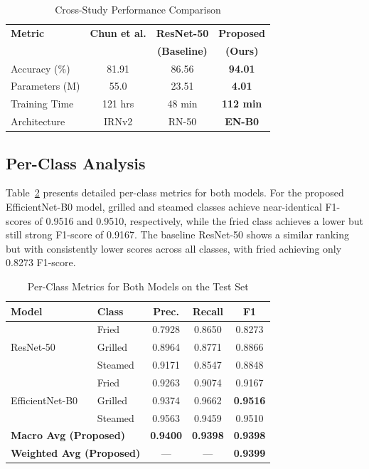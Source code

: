 \documentclass[journal]{IEEEtran}
\begin{document}
\begin{table}[!t]
\centering
\caption{Cross-Study Performance Comparison}
\label{tab:cross_comparison}
\begin{tabular}{lccc}
\toprule
\textbf{Metric} & \textbf{Chun et al.} & \textbf{ResNet-50} & \textbf{Proposed} \\
 & \textbf{\cite{chun2022korean}} & \textbf{(Baseline)} & \textbf{(Ours)} \\
\midrule
Accuracy (\%) & 81.91 & 86.56 & \textbf{94.01} \\
Parameters (M) & 55.0 & 23.51 & \textbf{4.01} \\
Training Time & 121 hrs & 48 min & \textbf{112 min} \\
Architecture & IRNv2 & RN-50 & \textbf{EN-B0} \\
\bottomrule
\end{tabular}
\end{table}

\subsection{Per-Class Analysis}

Table~\ref{tab:per_class} presents detailed per-class metrics for both models. For the proposed EfficientNet-B0 model, grilled and steamed classes achieve near-identical F1-scores of 0.9516 and 0.9510, respectively, while the fried class achieves a lower but still strong F1-score of 0.9167. The baseline ResNet-50 shows a similar ranking but with consistently lower scores across all classes, with fried achieving only 0.8273 F1-score.

\begin{table}[!t]
\centering
\caption{Per-Class Metrics for Both Models on the Test Set}
\label{tab:per_class}
\begin{tabular}{llccc}
\toprule
\textbf{Model} & \textbf{Class} & \textbf{Prec.} & \textbf{Recall} & \textbf{F1} \\
\midrule
\multirow{3}{*}{ResNet-50} 
 & Fried   & 0.7928 & 0.8650 & 0.8273 \\
 & Grilled & 0.8964 & 0.8771 & 0.8866 \\
 & Steamed & 0.9171 & 0.8547 & 0.8848 \\
\midrule
\multirow{3}{*}{EfficientNet-B0}
 & Fried   & 0.9263 & 0.9074 & 0.9167 \\
 & Grilled & 0.9374 & 0.9662 & \textbf{0.9516} \\
 & Steamed & 0.9563 & 0.9459 & 0.9510 \\
\midrule
\multicolumn{2}{l}{\textbf{Macro Avg (Proposed)}} & \textbf{0.9400} & \textbf{0.9398} & \textbf{0.9398} \\
\multicolumn{2}{l}{\textbf{Weighted Avg (Proposed)}} & --- & --- & \textbf{0.9399} \\
\bottomrule
\end{tabular}
\end{table}
\end{document}
